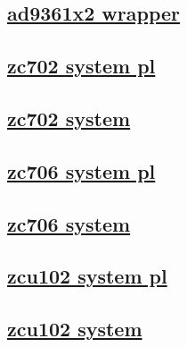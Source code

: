 \documentclass{article}
\begin{document}
  


  \subsection{\href{../files/ad9361x2_pl_wrapper-v.html}{ad9361x2 wrapper}}
  \subsection{\href{../files2/system_pl_wrapper-v.html}{zc702 system pl}}
  \subsection{\href{../files2/system_wrapper-v.html}{zc702 system}}
  \subsection{\href{../files3/system_pl_wrapper-v.html}{zc706 system pl}}
  \subsection{\href{../files3/system_wrapper-v.html}{zc706 system}}
  \subsection{\href{../files4/system_pl_wrapper-v.html}{zcu102 system pl}}
  \subsection{\href{../files4/system_wrapper-v.html}{zcu102 system}}
\end{document}
